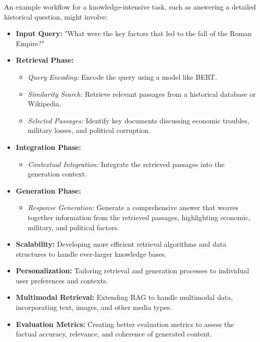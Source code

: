 An example workflow for a knowledge-intensive task, such as answering a detailed historical question, might involve:
\begin{itemize}
    \item \textbf{Input Query:} "What were the key factors that led to the fall of the Roman Empire?"
    \item \textbf{Retrieval Phase:}
    \begin{itemize}
        \item \textit{Query Encoding:} Encode the query using a model like BERT.
        \item \textit{Similarity Search:} Retrieve relevant passages from a historical database or Wikipedia.
        \item \textit{Selected Passages:} Identify key documents discussing economic troubles, military losses, and political corruption.
    \end{itemize}
    \item \textbf{Integration Phase:}
    \begin{itemize}
        \item \textit{Contextual Integration:} Integrate the retrieved passages into the generation context.
    \end{itemize}
    \item \textbf{Generation Phase:}
    \begin{itemize}
        \item \textit{Response Generation:} Generate a comprehensive answer that weaves together information from the retrieved passages, highlighting economic, military, and political factors.
    \end{itemize}
\end{itemize}

\begin{itemize}
    \item \textbf{Scalability:} Developing more efficient retrieval algorithms and data structures to handle ever-larger knowledge bases.
    \item \textbf{Personalization:} Tailoring retrieval and generation processes to individual user preferences and contexts.
    \item \textbf{Multimodal Retrieval:} Extending RAG to handle multimodal data, incorporating text, images, and other media types.
    \item \textbf{Evaluation Metrics:} Creating better evaluation metrics to assess the factual accuracy, relevance, and coherence of generated content.
\end{itemize}

